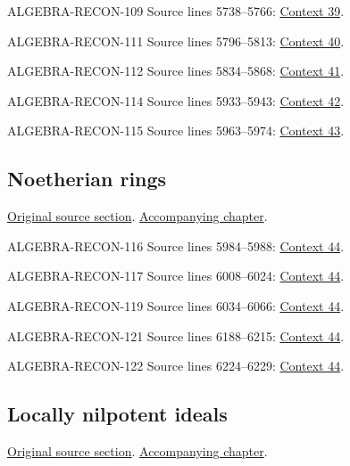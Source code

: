 \begin{AlgebraSourceRoutes}
\item[ALGEBRA-RECON-109] Source lines 5738--5766: \hyperlink{algebra-context-039}{Context 39}.
\item[ALGEBRA-RECON-111] Source lines 5796--5813: \hyperlink{algebra-context-040}{Context 40}.
\item[ALGEBRA-RECON-112] Source lines 5834--5868: \hyperlink{algebra-context-041}{Context 41}.
\item[ALGEBRA-RECON-114] Source lines 5933--5943: \hyperlink{algebra-context-042}{Context 42}.
\item[ALGEBRA-RECON-115] Source lines 5963--5974: \hyperlink{algebra-context-043}{Context 43}.
\end{AlgebraSourceRoutes}

\subsection{Noetherian rings}
\hypertarget{algebra-source-section-Noetherian}{}
\noindent\href{https://github.com/stacks/stacks-project/blob/a04446e57ec1fbc252a871afcec7752fb2807b14/algebra.tex\#L5980}{Original source section}. \href{algebra.pdf\#nameddest=section-Noetherian}{Accompanying chapter}.

\begin{AlgebraSourceRoutes}
\item[ALGEBRA-RECON-116] Source lines 5984--5988: \hyperlink{algebra-context-044}{Context 44}.
\item[ALGEBRA-RECON-117] Source lines 6008--6024: \hyperlink{algebra-context-044}{Context 44}.
\item[ALGEBRA-RECON-119] Source lines 6034--6066: \hyperlink{algebra-context-044}{Context 44}.
\item[ALGEBRA-RECON-121] Source lines 6188--6215: \hyperlink{algebra-context-044}{Context 44}.
\item[ALGEBRA-RECON-122] Source lines 6224--6229: \hyperlink{algebra-context-044}{Context 44}.
\end{AlgebraSourceRoutes}

\subsection{Locally nilpotent ideals}
\hypertarget{algebra-source-section-locally-nilpotent}{}
\noindent\href{https://github.com/stacks/stacks-project/blob/a04446e57ec1fbc252a871afcec7752fb2807b14/algebra.tex\#L6238}{Original source section}. \href{algebra.pdf\#nameddest=section-locally-nilpotent}{Accompanying chapter}.


